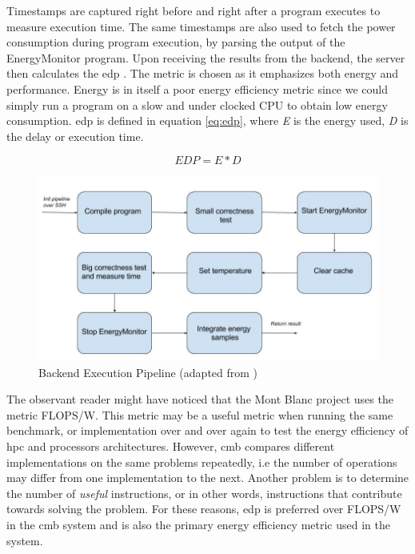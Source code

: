Timestamps are captured right before and right after a program executes to measure execution time. The same timestamps are also used to fetch the power consumption during program execution, by parsing the output of the EnergyMonitor program. Upon receiving the results from the backend, the server then calculates the \gls{edp} \cite{a:edp}. The metric is chosen as it emphasizes both energy and performance. Energy is in itself a poor energy efficiency metric since we could simply run a program on a slow and under clocked CPU to obtain low energy consumption. \gls{edp} is defined in equation \ref{eq:edp}, where \textit{E} is the energy used, \textit{D} is the delay or execution time.

\begin{equation}
  \label{eq:edp}
  EDP = E * D
\end{equation}

\begin{figure}
  \includegraphics[width=1.0\textwidth]{figs/execution_pipeline.jpg}
  \caption[Backend Execution Pipeline]{Backend Execution Pipeline (adapted from \cite{mt:T&S})}
  \label{fig:execution-pipeline}
\end{figure}

The observant reader might have noticed that the Mont Blanc project uses the metric FLOPS/W. This metric may be a useful metric when running the same benchmark, or implementation over and over again to test the energy efficiency of \gls{hpc} and processors architectures. However, \gls{cmb} compares different implementations on the same problems repeatedly, i.e the number of operations may differ from one implementation to the next. Another problem is to determine the number of \textit{useful} instructions, or in other words, instructions that contribute towards solving the problem. For these reasons, \gls{edp} is preferred over FLOPS/W in the \gls{cmb} system and is also the primary energy efficiency metric used in the system.

